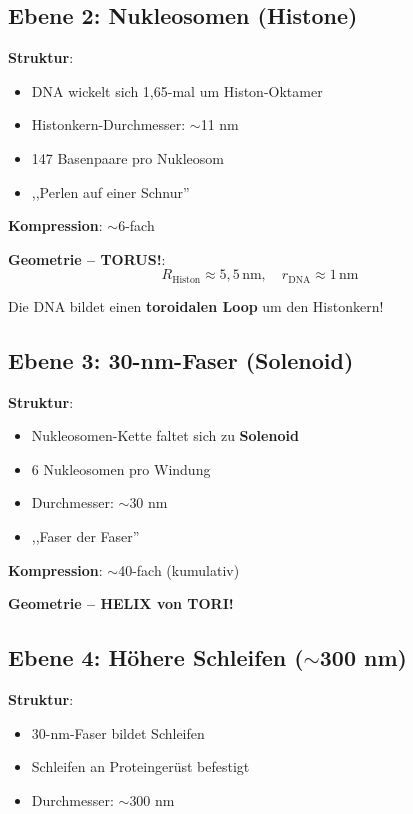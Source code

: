 	\subsection{Ebene 2: Nukleosomen (Histone)}
	
	\textbf{Struktur}:
	\begin{itemize}
		\item DNA wickelt sich 1,65-mal um Histon-Oktamer
		\item Histonkern-Durchmesser: $\sim$11 nm
		\item 147 Basenpaare pro Nukleosom
		\item ,,Perlen auf einer Schnur''
	\end{itemize}
	
	\textbf{Kompression}: $\sim$6-fach
	
	\textbf{Geometrie -- TORUS!}:
	\begin{equation}
		R_{\text{Histon}} \approx 5{,}5\,\text{nm}, \quad r_{\text{DNA}} \approx 1\,\text{nm}
	\end{equation}
	
	Die DNA bildet einen \textbf{toroidalen Loop} um den Histonkern!
	
	\subsection{Ebene 3: 30-nm-Faser (Solenoid)}
	
	\textbf{Struktur}:
	\begin{itemize}
		\item Nukleosomen-Kette faltet sich zu \textbf{Solenoid}
		\item 6 Nukleosomen pro Windung
		\item Durchmesser: $\sim$30 nm
		\item ,,Faser der Faser''
	\end{itemize}
	
	\textbf{Kompression}: $\sim$40-fach (kumulativ)
	
	\textbf{Geometrie -- HELIX von TORI!}
	
	\subsection{Ebene 4: Höhere Schleifen ($\sim$300 nm)}
	
	\textbf{Struktur}:
	\begin{itemize}
		\item 30-nm-Faser bildet Schleifen
		\item Schleifen an Proteingerüst befestigt
		\item Durchmesser: $\sim$300 nm
	\end{itemize}
	
